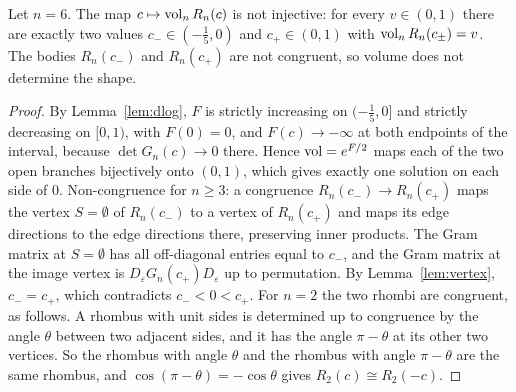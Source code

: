 \begin{theorem}\label{thm:main}
Let $n=6$. The map $c\mapsto\operatorname{vol}_nR_n(c)$ is not injective: for every $v\in(0,1)$ there are exactly two values $c_-\in(- \frac{1}{5},0)$ and $c_+\in(0,1)$ with $\operatorname{vol}_nR_n(c_\pm)=v$.
The bodies $R_n(c_-)$ and $R_n(c_+)$ are not congruent, so volume does not determine the shape.
\end{theorem}
\begin{proof}
By Lemma~\ref{lem:dlog}, $F$ is strictly increasing on $(- \frac{1}{5},0]$ and strictly decreasing on $[0,1)$, with $F(0)=0$, and $F(c)\to-\infty$ at both endpoints of the interval, because $\det G_n(c)\to0$ there.
Hence $\operatorname{vol}=e^{F/2}$ maps each of the two open branches bijectively onto $(0,1)$, which gives exactly one solution on each side of $0$.
Non-congruence for $n\ge3$: a congruence $R_n(c_-)\to R_n(c_+)$ maps the vertex $S=\emptyset$ of $R_n(c_-)$ to a vertex of $R_n(c_+)$ and maps its edge directions to the edge directions there, preserving inner products. The Gram matrix at $S=\emptyset$ has all off-diagonal entries equal to $c_-$, and the Gram matrix at the image vertex is $D_\varepsilon G_n(c_+)D_\varepsilon$ up to permutation. By Lemma~\ref{lem:vertex}, $c_-=c_+$, which contradicts $c_-<0<c_+$. For $n=2$ the two rhombi are congruent, as follows. A rhombus with unit sides is determined up to congruence by the angle $\theta$ between two adjacent sides, and it has the angle $\pi-\theta$ at its other two vertices. So the rhombus with angle $\theta$ and the rhombus with angle $\pi-\theta$ are the same rhombus, and $\cos(\pi-\theta)=-\cos\theta$ gives $R_2(c)\cong R_2(-c)$.
\end{proof}
